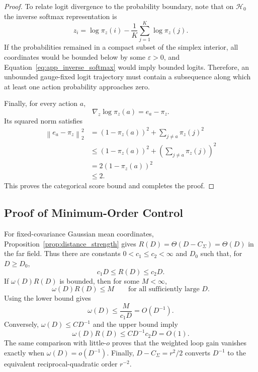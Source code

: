 \documentclass{article}
\theoremstyle{plain}
\theoremstyle{definition}
\theoremstyle{remark}
\begin{document}
\begin{proof}
To relate logit divergence to the probability boundary, note that on
$\mathcal{H}_0$ the inverse softmax representation is
\begin{equation}
    z_i
    =
    \log\pi_z(i)
    -
    \frac{1}{K}
    \sum_{j=1}^{K}
    \log\pi_z(j).
    \label{eq:app_inverse_softmax}
\end{equation}
If the probabilities remained in a compact subset of the simplex
interior, all coordinates would be bounded below by some
$\varepsilon>0$, and
Equation~\eqref{eq:app_inverse_softmax} would imply bounded logits.
Therefore, an unbounded gauge-fixed logit trajectory must contain a
subsequence along which at least one action probability approaches zero.

Finally, for every action $a$,
\begin{equation}
    \nabla_z\log\pi_z(a)
    =
    e_a-\pi_z.
\end{equation}
Its squared norm satisfies
\begin{equation}
\begin{aligned}
    \left\|
        e_a-\pi_z
    \right\|_2^2
    &=
    \left(
        1-\pi_z(a)
    \right)^2
    +
    \sum_{j\neq a}
    \pi_z(j)^2 \\
    &\leq
    \left(
        1-\pi_z(a)
    \right)^2
    +
    \left(
        \sum_{j\neq a}
        \pi_z(j)
    \right)^2 \\
    &=
    2
    \left(
        1-\pi_z(a)
    \right)^2 \\
    &\leq
    2.
\end{aligned}
\end{equation}
This proves the categorical score bound and completes the proof.
\end{proof}

\subsection{Proof of Minimum-Order Control}
\label{app:min_order_control}

For fixed-covariance Gaussian mean coordinates,
Proposition~\ref{prop:distance_strength} gives
\(R(D)=\Theta(D-C_\Sigma)=\Theta(D)\) in the far field. Thus there are
constants \(0<c_1\le c_2<\infty\) and \(D_0\) such that, for
\(D\ge D_0\),
\[
    c_1 D
    \le
    R(D)
    \le
    c_2 D .
\]
If \(\omega(D)R(D)\) is bounded, then for some \(M<\infty\),
\[
    \omega(D)R(D)\le M
    \qquad
    \text{for all sufficiently large } D .
\]
Using the lower bound gives
\[
    \omega(D)
    \le
    \frac{M}{c_1D}
    =
    O(D^{-1}).
\]
Conversely, \(\omega(D)\le CD^{-1}\) and the upper bound imply
\[
    \omega(D)R(D)
    \le
    CD^{-1}c_2D
    =
    O(1).
\]
The same comparison with little-\(o\) proves that the weighted loop gain
vanishes exactly when \(\omega(D)=o(D^{-1})\). Finally,
\(D-C_\Sigma=r^2/2\) converts \(D^{-1}\) to the equivalent
reciprocal-quadratic order \(r^{-2}\).
\end{document}
